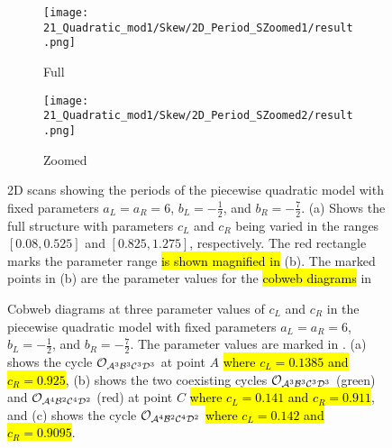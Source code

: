 \begin{figure}
	\centering
	\begin{subfigure}{0.4\textwidth}
		\centering
		\texttt{[image: 21\_Quadratic\_mod1/Skew/2D\_Period\_SZoomed1/result.png]}
		\caption{Full}
		\label{fig:setup.quad.skew.period.full}
	\end{subfigure}
	\begin{subfigure}{0.4\textwidth}
		\texttt{[image: 21\_Quadratic\_mod1/Skew/2D\_Period\_SZoomed2/result.png]}
		\caption{Zoomed}
		\label{fig:setup.quad.skew.period.zoomed}
	\end{subfigure}
	\caption[2D scans showing periods of the skewed piecewise quadratic model]{
		2D scans showing the periods of the piecewise quadratic model with fixed parameters $a_L = a_R = 6$, $b_L = -\frac{1}{2}$, and $b_R = -\frac{7}{2}$.
		(a) Shows the full structure with parameters $c_L$ and $c_R$ being varied in the ranges $[0.08, 0.525]$ and $[0.825, 1.275]$, respectively.
		The red rectangle marks the parameter range \hl{is shown magnified in} (b).
		The marked points in (b) are the parameter values for the \hl{cobweb diagrams} in 
	}
	\label{fig:setup.quad.skew.period}
\end{figure}

\begin{figure}
	\centering
	\caption[Cobwebs of the skewed piecewise quadratic model]{
		Cobweb diagrams at three parameter values of $c_L$ and $c_R$ in the piecewise quadratic model with fixed parameters $a_L = a_R = 6$, $b_L = -\frac{1}{2}$, and $b_R = -\frac{7}{2}$.
		The parameter values are marked in .
		(a) shows the cycle $\mathcal{O}_{\mathcal{A}^3\mathcal{B}^3\mathcal{C}^3\mathcal{D}^3}$ at point $A$ \hl{where $c_L = 0.1385$ and $c_R = 0.925$},
		(b) shows the two coexisting cycles $\mathcal{O}_{\mathcal{A}^3\mathcal{B}^3\mathcal{C}^3\mathcal{D}^3}$ (green) and $\mathcal{O}_{\mathcal{A}^4\mathcal{B}^2\mathcal{C}^4\mathcal{D}^2}$ (red) at point $C$ \hl{where $c_L = 0.141$ and $c_R = 0.911$},
		and (c) shows the cycle $\mathcal{O}_{\mathcal{A}^4\mathcal{B}^2\mathcal{C}^4\mathcal{D}^2}$ \hl{where $c_L = 0.142$ and $c_R = 0.9095$}.
	}
	\label{fig:setup.quad.skew.cobwebs}
\end{figure}

